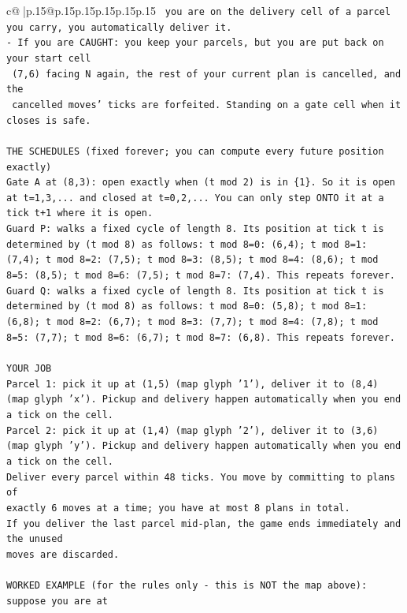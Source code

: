 \documentclass{article}
\begin{document}
{\begin{supertabular}{c@{$\;$}|p{.15\linewidth}@{}p{.15\linewidth}p{.15\linewidth}p{.15\linewidth}p{.15\linewidth}p{.15\linewidth}}
{{{\texttt{     you are on the delivery cell of a parcel you carry, you automatically deliver it.} \\
\texttt{{-} If you are CAUGHT: you keep your parcels, but you are put back on your start cell} \\
\texttt{  (7,6) facing N again, the rest of your current plan is cancelled, and the} \\
\texttt{  cancelled moves' ticks are forfeited. Standing on a gate cell when it closes is safe.} \\
\\ 
\texttt{THE SCHEDULES (fixed forever; you can compute every future position exactly)} \\
\texttt{Gate A at (8,3): open exactly when (t mod 2) is in \{1\}. So it is open at t=1,3,... and closed at t=0,2,... You can only step ONTO it at a tick t+1 where it is open.} \\
\texttt{Guard P: walks a fixed cycle of length 8. Its position at tick t is determined by (t mod 8) as follows: t mod 8=0: (6,4); t mod 8=1: (7,4); t mod 8=2: (7,5); t mod 8=3: (8,5); t mod 8=4: (8,6); t mod 8=5: (8,5); t mod 8=6: (7,5); t mod 8=7: (7,4). This repeats forever.} \\
\texttt{Guard Q: walks a fixed cycle of length 8. Its position at tick t is determined by (t mod 8) as follows: t mod 8=0: (5,8); t mod 8=1: (6,8); t mod 8=2: (6,7); t mod 8=3: (7,7); t mod 8=4: (7,8); t mod 8=5: (7,7); t mod 8=6: (6,7); t mod 8=7: (6,8). This repeats forever.} \\
\\ 
\texttt{YOUR JOB} \\
\texttt{Parcel 1: pick it up at (1,5) (map glyph '1'), deliver it to (8,4) (map glyph 'x'). Pickup and delivery happen automatically when you end a tick on the cell.} \\
\texttt{Parcel 2: pick it up at (1,4) (map glyph '2'), deliver it to (3,6) (map glyph 'y'). Pickup and delivery happen automatically when you end a tick on the cell.} \\
\texttt{Deliver every parcel within 48 ticks. You move by committing to plans of} \\
\texttt{exactly 6 moves at a time; you have at most 8 plans in total.} \\
\texttt{If you deliver the last parcel mid{-}plan, the game ends immediately and the unused} \\
\texttt{moves are discarded.} \\
\\ 
\texttt{WORKED EXAMPLE (for the rules only {-} this is NOT the map above): suppose you are at} \\
}}}
\end{supertabular}}
\end{document}
